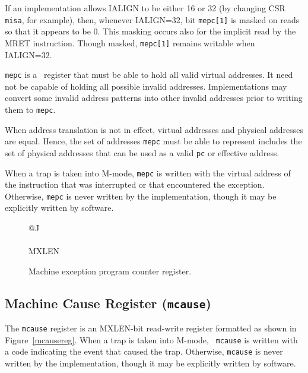 If an implementation allows IALIGN to be either 16 or 32 (by
changing CSR {\tt misa}, for example), then, whenever IALIGN=32, bit
{\tt mepc[1]} is masked on reads so that it appears to be 0.  This
masking occurs also for the implicit read by the MRET instruction.
Though masked, {\tt mepc[1]} remains writable when IALIGN=32.

{\tt mepc} is a \warl\ register that must be able to hold all valid
virtual addresses.  It need not be capable of holding all possible invalid
addresses.  Implementations may convert some invalid address patterns into
other invalid addresses prior to writing them to {\tt mepc}.

\begin{commentary}
When address translation is not in effect, virtual addresses and physical
addresses are equal.
Hence, the set of addresses {\tt mepc} must be able to represent includes the
set of physical addresses that can be used as a valid {\tt pc} or effective
address.
\end{commentary}

When a trap is taken into M-mode, {\tt mepc} is written with the
virtual address of the instruction that was interrupted or that
encountered the exception.  Otherwise, {\tt mepc} is never written by
the implementation, though it may be explicitly written by software.

\begin{figure}[h!]
{\footnotesize
\begin{center}
\begin{tabular}{@{}J}
 \\
\hline
{} \\
\hline
MXLEN \\
\end{tabular}
\end{center}
}
\vspace{-0.1in}
\caption{Machine exception program counter register.}
\label{mepcreg}
\end{figure}

\subsection{Machine Cause Register ({\tt mcause})}
\label{sec:mcause}

The {\tt mcause} register is an MXLEN-bit read-write register formatted as
shown in Figure~\ref{mcausereg}.  When a trap is taken into M-mode, {\tt
mcause} is written with a code indicating the event that caused the trap.
Otherwise, {\tt mcause} is never written by the implementation, though it may be
explicitly written by software.

